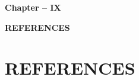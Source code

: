 \documentclass[12pt,a4paper]{article}
\begin{document}
\thispagestyle{plain}


\clearpage

\begin{center}
    \vspace*{10cm}
    
    {\fontsize{16}{19.2}\selectfont\bfseries
    Chapter -- IX}
    
    \vspace{1cm}
    
    {\fontsize{16}{19.2}\selectfont\bfseries
    REFERENCES}
    
    \vspace*{\fill}
\end{center}

\thispagestyle{plain}


\clearpage

\section{REFERENCES}
\justifying
\end{document}
